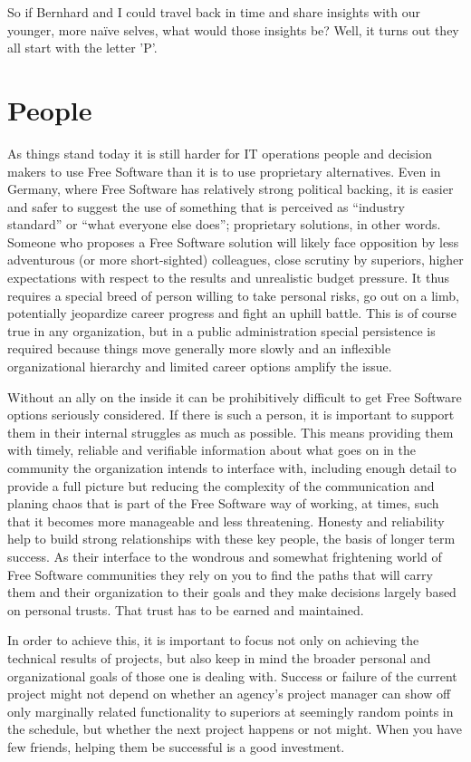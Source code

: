 So if Bernhard and I could travel back in time and share insights with our younger, more
naïve selves, what would those insights be? Well, it turns out they all start with the
letter 'P'.

\section*{People}

As things stand today it is still harder for IT operations people and decision
makers to use Free Software than it is to use proprietary alternatives. Even in
Germany, where Free Software has relatively strong political backing, it is
easier and safer to suggest the use of something that is perceived as ``industry
standard'' or ``what everyone else does''; proprietary solutions, in other words.
Someone who proposes a Free Software solution will likely face opposition by
less adventurous (or more short-sighted) colleagues, close scrutiny by
superiors, higher expectations with respect to the results and unrealistic
budget pressure. It thus requires a special breed of person willing to take
personal risks, go out on a limb, potentially jeopardize career progress and
fight an uphill battle. This is of course true in any organization, but in a
public administration special persistence is required because things move
generally more slowly and an inflexible organizational hierarchy and limited
career options amplify the issue.

Without an ally on the inside it can be prohibitively difficult to get
Free Software options seriously considered. If there is such a person, it is important
to support them in their internal struggles as much as possible. This
means providing them with timely, reliable and verifiable information about
what goes on in the community the organization intends to interface with,
including enough detail to provide a full picture but reducing the
complexity of the communication and planing chaos that is part of the Free
Software way of working, at times, such that it becomes more manageable and
less threatening. Honesty and reliability help to build strong
relationships with these key people, the basis of longer term success. As
their interface to the wondrous and somewhat frightening world of Free
Software communities they rely on you to find the paths that will carry
them and their organization to their goals and they make decisions largely
based on personal trusts. That trust has to be earned and maintained.

In order to achieve this, it is important to focus not only on achieving
the technical results of projects, but also keep in mind the broader personal and organizational
goals of those one is dealing with. Success or failure of the current
project might not depend on whether an agency's project manager can show off
only marginally related functionality to superiors at seemingly random points
in the schedule, but whether the next project happens or not might. When you have
few friends, helping them be successful is a good investment.

